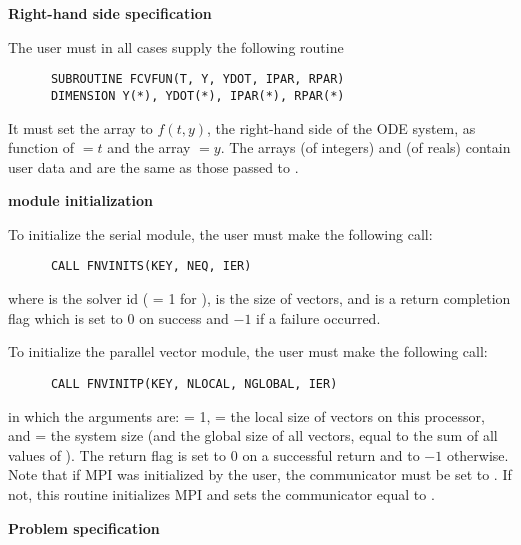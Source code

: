 \begin{Steps}
  
\item {\bf Right-hand side specification}
  
  The user must in all cases supply the following {\F} routine
\begin{verbatim}
      SUBROUTINE FCVFUN(T, Y, YDOT, IPAR, RPAR)
      DIMENSION Y(*), YDOT(*), IPAR(*), RPAR(*)
\end{verbatim}
  It must set the  array to $f(t,y)$, the right-hand side of the ODE
  system, as function of $=t$ and the array $=y$.  
  The arrays  (of integers) and  (of reals) contain user data
  and are the same as those passed to .

\item  {\bf {\nvector} module initialization}

  {\s} To initialize the serial {\nvector} module, the user must make the
  following call:
\begin{verbatim}
      CALL FNVINITS(KEY, NEQ, IER)
\end{verbatim}
  where 
   is the solver id ( = 1 for {\cvode}),
   is the size of vectors, and
   is a  return completion flag which is set to $0$ on success and $-1$ 
  if a failure occurred.
  
  {\p} To initialize the parallel vector module, the user must make the
  following call:
\begin{verbatim}
      CALL FNVINITP(KEY, NLOCAL, NGLOBAL, IER)
\end{verbatim}
  in which the arguments are:  = 1,  = the local size of
  vectors on this processor, and  = the system size (and the global
  size of all vectors, equal to the sum of all values of ).
  The return flag  is set to $0$ on a successful return and to $-1$
  otherwise.
  Note that if MPI was initialized by the user, the communicator must be
  set to .  If not, this routine initializes MPI and sets
  the communicator equal to .
  
\item {\bf Problem specification}


\end{Steps}
